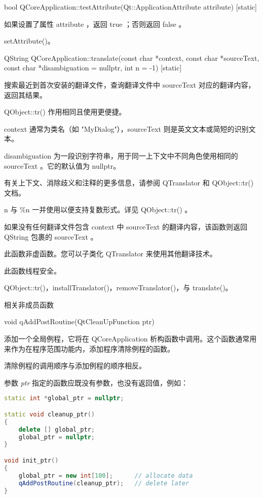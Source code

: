 bool QCoreApplication::testAttribute(Qt::ApplicationAttribute attribute) [static]

如果设置了属性 attribute ，返回 true ；否则返回 false 。


\begin{notice}[另请参阅]
setAttribute()。
\end{notice}

QString QCoreApplication::translate(const char *context, const char *sourceText, const char *disambiguation = nullptr, int n = -1) [static]

搜索最近到首次安装的翻译文件，查询翻译文件中 sourceText 对应的翻译内容，返回其结果。

QObject::tr() 作用相同且使用更便捷。

context 通常为类名（如 "MyDialog"），sourceText 则是英文文本或简短的识别文本。

disambiguation 为一段识别字符串，用于同一上下文中不同角色使用相同的 sourceText 。它的默认值为 nullptr。

有关上下文、消除歧义和注释的更多信息，请参阅 QTranslator 和 QObject::tr() 文档。

n 与 \%n 一并使用以便支持复数形式。详见 QObject::tr() 。

如果没有任何翻译文件包含 context 中 sourceText 的翻译内容，该函数则返回 QString 包裹的 sourceText 。

此函数非虚函数。您可以子类化 QTranslator 来使用其他翻译技术。


\begin{notice}
此函数线程安全。
\end{notice}


\begin{notice}[另请参阅]
QObject::tr()，installTranslator()，removeTranslator()，与 translate()。
\end{notice}

\splitLine

相关非成员函数

void qAddPostRoutine(QtCleanUpFunction ptr)

添加一个全局例程，它将在 QCoreApplication 析构函数中调用。这个函数通常用来作为在程序范围功能内，添加程序清除例程的函数。

清除例程的调用顺序与添加例程的顺序相反。

参数 \emph{ptr} 指定的函数应既没有参数，也没有返回值，例如：


\begin{lstlisting}[language=C++]
static int *global_ptr = nullptr;

static void cleanup_ptr()
{
    delete [] global_ptr;
    global_ptr = nullptr;
}

void init_ptr()
{
    global_ptr = new int[100];      // allocate data
    qAddPostRoutine(cleanup_ptr);   // delete later
}
\end{lstlisting}



